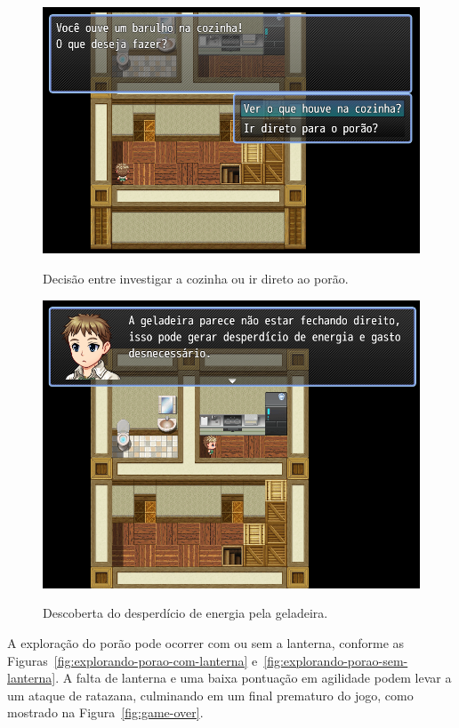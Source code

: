 \begin{figure}[!htbp]
	\centering
	\caption{Decisão entre investigar a cozinha ou ir direto ao porão.}
	\includegraphics[scale=0.45]{Textuais/Pictures/chega-cozinha-papelaria.png}
	\label{fig:chega-cozinha-papelaria}
\end{figure}

\begin{figure}[!htbp]
	\centering
	\caption{Descoberta do desperdício de energia pela geladeira.}
	\includegraphics[scale=0.45]{Textuais/Pictures/desperdicio-geladeira.png}
	\label{fig:desperdicio-geladeira}
\end{figure}

A exploração do porão pode ocorrer com ou sem a lanterna, conforme as Figuras~\ref{fig:explorando-porao-com-lanterna} e~\ref{fig:explorando-porao-sem-lanterna}. A falta de lanterna e uma baixa pontuação em agilidade podem levar a um ataque de ratazana, culminando em um final prematuro do jogo, como mostrado na Figura~\ref{fig:game-over}.

